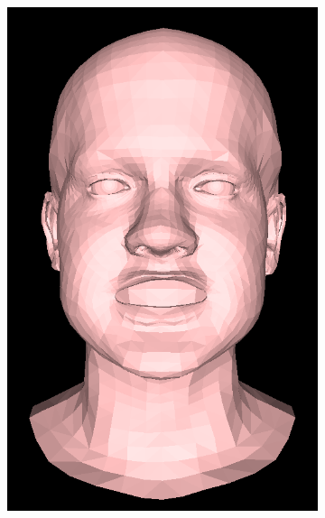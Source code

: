 \begin{figure}[h]
\begin{subfigure}[b]{0.24\textwidth}
        \includegraphics[width=\textwidth]{figures/blendshape_interp/3/00003.png}
    \end{subfigure}
    \begin{subfigure}[b]{0.24\textwidth}

\end{subfigure}
\end{figure}
